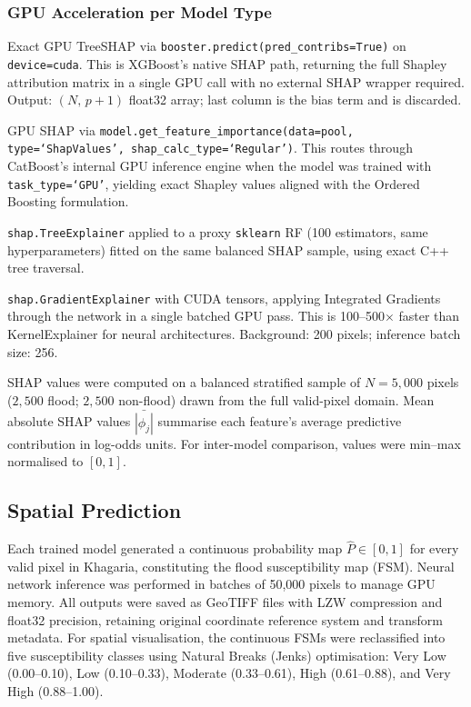 \documentclass[12pt, a4paper]{article}
\begin{document}
\subsubsection{GPU Acceleration per Model Type}

\begin{description}[style=nextline, align=left]
  \item[\textbf{XGBoost:}] Exact GPU TreeSHAP via \texttt{booster.predict(pred\_contribs=True)} on \texttt{device=cuda}.  This is XGBoost's native SHAP path, returning the full Shapley attribution matrix in a single GPU call with no external SHAP wrapper required. Output: $(N,\,p+1)$ float32 array; last column is the bias term and is discarded.

  \item[\textbf{CatBoost:}] GPU SHAP via \texttt{model.get\_feature\_importance(data=pool, type=`ShapValues', shap\_calc\_type=`Regular')}. This routes through CatBoost's internal GPU inference engine when the model was trained with \texttt{task\_type=`GPU'}, yielding exact Shapley values aligned with the Ordered Boosting formulation.

  \item[\textbf{RandomForest:}] \texttt{shap.TreeExplainer} applied to a proxy \texttt{sklearn} RF (100 estimators, same hyperparameters) fitted on the same balanced SHAP sample, using exact C++ tree traversal.

  \item[\textbf{ANN and DNN:}] \texttt{shap.GradientExplainer} with CUDA tensors, applying Integrated Gradients \citep{Sundararajan2017} through the network in a single batched GPU pass.  This is 100--500$\times$ faster than KernelExplainer for neural architectures. Background: 200 pixels; inference batch size: 256.
\end{description}

SHAP values were computed on a balanced stratified sample of $N = 5{,}000$ pixels ($2{,}500$ flood; $2{,}500$ non-flood) drawn from the full valid-pixel domain.  Mean absolute SHAP values $\bar{|\phi_j|}$ summarise each feature's average predictive contribution in log-odds units.  For inter-model comparison, values were min--max normalised to $[0,1]$.

\subsection{Spatial Prediction}

Each trained model generated a continuous probability map $\hat{P} \in [0,1]$ for every valid pixel in Khagaria, constituting the flood susceptibility map (FSM). Neural network inference was performed in batches of 50,000 pixels to manage GPU memory. All outputs were saved as GeoTIFF files with LZW compression and float32 precision, retaining original coordinate reference system and transform metadata. For spatial visualisation, the continuous FSMs were reclassified into five susceptibility classes using Natural Breaks (Jenks) optimisation: Very Low (0.00--0.10), Low (0.10--0.33), Moderate (0.33--0.61), High (0.61--0.88), and Very High (0.88--1.00).
\end{document}
